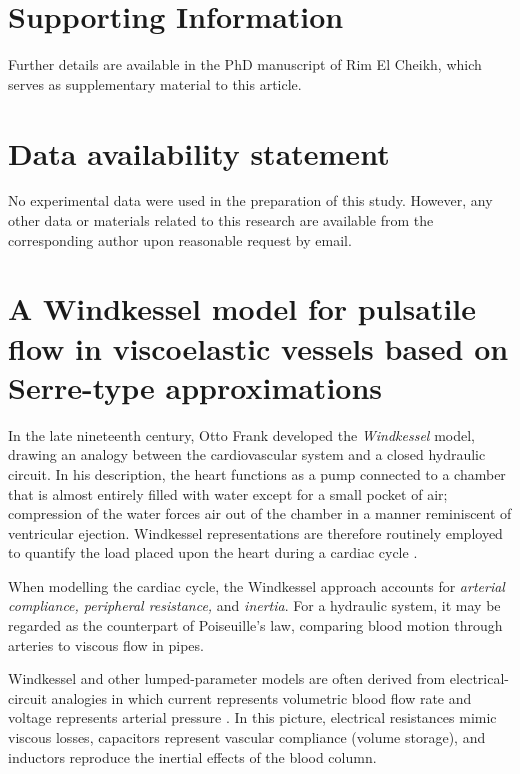 \documentclass[alpha-refs, 12pt]{wiley-article}
\begin{document}
\section*{Supporting Information}

Further details are available in the PhD manuscript of Rim El Cheikh, which serves as supplementary material to this article.

\section*{Data availability statement}

No experimental data were used in the preparation of this study. However, any other data or materials related to this research are available from the corresponding author upon reasonable request by email.

\printendnotes

\printglossary[type=\acronymtype]



\appendix
\section{A Windkessel model for pulsatile flow in viscoelastic vessels based on Serre-type approximations}\label{sec:windkessel}

In the late nineteenth century, Otto Frank developed the \emph{Windkessel} model, drawing an analogy between the cardiovascular system and a closed hydraulic circuit. In his description, the heart functions as a pump connected to a chamber that is almost entirely filled with water except for a small pocket of air; compression of the water forces air out of the chamber in a manner reminiscent of ventricular ejection. Windkessel representations are therefore routinely employed to quantify the load placed upon the heart during a cardiac cycle \cite{Catanho2012}.

When modelling the cardiac cycle, the Windkessel approach accounts for \emph{arterial compliance, peripheral resistance,} and \emph{inertia}. For a hydraulic system, it may be regarded as the counterpart of Poiseuille's law, comparing blood motion through arteries to viscous flow in pipes.

Windkessel and other lumped-parameter models are often derived from electrical-circuit analogies in which current represents volumetric blood flow rate and voltage represents arterial pressure \cite{Avolio1980, Segers1998, Milisic2004}. In this picture, electrical resistances mimic viscous losses, capacitors represent vascular compliance (volume storage), and inductors reproduce the inertial effects of the blood column.
\end{document}
